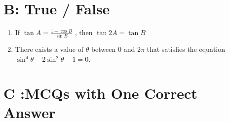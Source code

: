 \documentclass[journal,12pt,twocolumn]{IEEEtran}
\theoremstyle{remark}
\begin{document}
\section*{\textbf{B: True / False}}



\begin{enumerate}



	\item If $\tan A = \frac{1-\cos B}{\sin B}$ , then $\tan 2A = \tan B$ 
		\hfill{}



	\item There exists a value of $\theta$ between $0$ and $2\pi$ that satisfies the equation $\sin^{4}\theta -2\sin^{2}\theta-1=0$. 
		\hfill{}



\end{enumerate}



\section*{\textbf{C :MCQs with One Correct Answer}}
\end{document}
